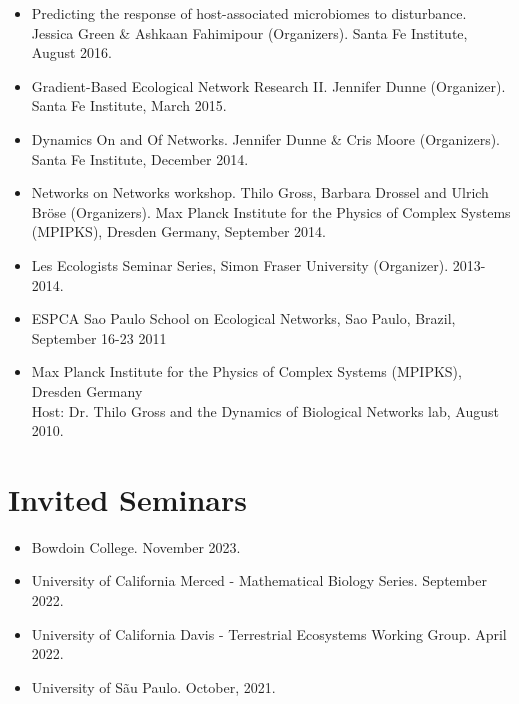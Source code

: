 \documentclass[margin,line,12pt]{res}
\begin{document}
\begin{resume}
\begin{itemize}
\item Predicting the response of host-associated microbiomes to disturbance. Jessica Green \& Ashkaan Fahimipour (Organizers). Santa Fe Institute, August 2016.

\item Gradient-Based Ecological Network Research II. Jennifer Dunne (Organizer). Santa Fe Institute, March 2015.

\item Dynamics On and Of Networks. Jennifer Dunne \& Cris Moore (Organizers). Santa Fe Institute, December 2014.

\item Networks on Networks workshop. Thilo Gross, Barbara Drossel and Ulrich Br\"ose (Organizers). Max Planck Institute for the Physics of Complex Systems (MPIPKS), Dresden Germany, September 2014.

\item Les Ecologists Seminar Series, Simon Fraser University (Organizer). 2013-2014.

\item ESPCA Sao Paulo School on Ecological Networks, Sao Paulo, Brazil, September 16-23 2011

\item Max Planck Institute for the Physics of Complex Systems (MPIPKS), Dresden Germany\\
	Host: Dr. Thilo Gross and the Dynamics of Biological Networks lab, August 2010.

\end{itemize}


\section{\sc Invited Seminars}
\begin{itemize}

\item Bowdoin College. November 2023.

\item University of California Merced - Mathematical Biology Series. September 2022.

\item University of California Davis - Terrestrial Ecosystems Working Group. April 2022.

\item University of S\~au Paulo. October, 2021.


\end{itemize}
\end{resume}
\end{document}
